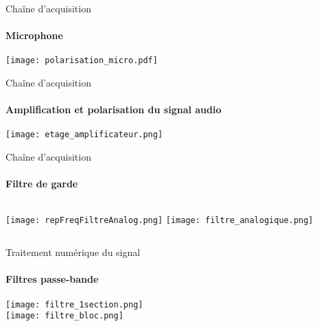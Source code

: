 \begin{frame}{Chaîne d'acquisition}
  \framesubtitle{Microphone}
  \centering
  \texttt{[image: polarisation\_micro.pdf]}
\end{frame}

\begin{frame}{Chaîne d'acquisition}
  \framesubtitle{Amplification et polarisation du signal audio}
  \texttt{[image: etage\_amplificateur.png]}
\end{frame}

\begin{frame}{Chaîne d'acquisition}
  \framesubtitle{Filtre de garde}
  \begin{columns}[c]
  \texttt{[image: repFreqFiltreAnalog.png]}
  \texttt{[image: filtre\_analogique.png]}
  \end{columns}
\end{frame}

\begin{frame}{Traitement numérique du signal}
  \framesubtitle{Filtres passe-bande}
  \begin{center}
  \texttt{[image: filtre\_1section.png]}\\
  \texttt{[image: filtre\_bloc.png]}
  \end{center}
\end{frame}


